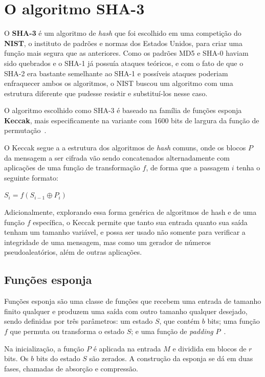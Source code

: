 \section{O algoritmo SHA-3}

O \textbf{SHA-3} é um algoritmo de \textit{hash} que foi escolhido em uma
competição do \textbf{NIST}, o instituto de padrões e normas dos Estados
Unidos, para criar uma função mais segura que as anteriores. Como os padrões
MD5 e SHA-0 haviam sido quebrados e o SHA-1 já possuía ataques teóricos, e com
o fato de que o SHA-2 era bastante semelhante ao SHA-1 e possíveis ataques
poderiam enfraquecer ambos os algoritmos, o NIST buscou um algoritmo com uma
estrutura diferente que pudesse resistir e substituí-los nesse caso.

O algoritmo escolhido como SHA-3 é baseado na família de funções esponja
\textbf{Keccak}, mais especificamente na variante com 1600 bits de largura da
função de permutação~\cite{fips:2015}.

O Keccak segue a a estrutura dos algoritmos de \textit{hash} comuns, onde os
blocos $P$ da mensagem a ser cifrada vão sendo concatenados alternadamente com
aplicações de uma função de transformação $f$, de forma que a passagem $i$
tenha o seguinte formato:

\begin{center}
        $S_{i} = f(S_{i-1} \oplus P_{i})$
\end{center}

Adicionalmente, explorando essa forma genérica de algoritmos de hash e de uma
função $f$ específica, o Keccak permite que tanto sua entrada quanto sua saída
tenham um tamanho variável, e possa ser usado não somente para verificar a
integridade de uma mensagem, mas como um gerador de números pseudoaleatórios,
além de outras aplicações.

\subsection{Funções esponja}

Funções esponja são uma classe de funções que recebem uma entrada de tamanho
finito qualquer e produzem uma saída com outro tamanho qualquer desejado, sendo
definidas por três parâmetros: um estado $S$, que contém $b$ bits; uma função
$f$ que permuta ou transforma o estado $S$; e uma função de \textit{padding}
$P$~\cite{noekeon:2011}.

Na inicialização, a função $P$ é aplicada na entrada $M$ e dividida em blocos
de $r$ bits. Os $b$ bits do estado $S$ são zerados. A construção da esponja se
dá em duas fases, chamadas de absorção e compressão.

